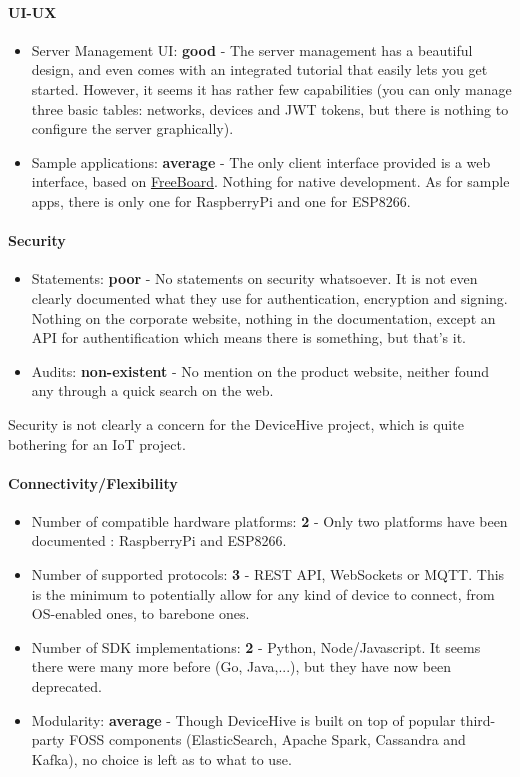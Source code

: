 \documentclass{article}
\begin{document}
\paragraph{UI-UX}

\begin{itemize}
\item Server Management UI: \textbf{good} - The server management has a beautiful design, and even comes with an integrated tutorial that easily lets you get started. However, it seems it has rather few capabilities (you can only manage three basic tables: networks, devices and JWT tokens, but there is nothing to configure the server graphically).
\item Sample applications: \textbf{average} - The only client interface provided is a web interface, based on \href{http://freeboard.io/}{FreeBoard}. Nothing for native development. As for sample apps, there is only one for RaspberryPi and one for ESP8266.
\end{itemize}

\paragraph{Security}

\begin{itemize}
\item Statements: \textbf{poor} - No statements on security whatsoever. It is not even clearly documented what they use for authentication, encryption and signing. Nothing on the corporate website, nothing in the documentation, except an API for authentification which means there is something, but that's it.
\item Audits: \textbf{non-existent} - No mention on the product website, neither found any through a quick search on the web.
\end{itemize}

Security is not clearly a concern for the DeviceHive project, which is quite bothering for an IoT project.

\paragraph{Connectivity/Flexibility}

\begin{itemize}
\item Number of compatible hardware platforms: \textbf{2} - Only two platforms have been documented : RaspberryPi and ESP8266.
\item Number of supported protocols: \textbf{3} - REST API, WebSockets or MQTT. This is the minimum to potentially allow for any kind of device to connect, from OS-enabled ones, to barebone ones.
\item Number of SDK implementations: \textbf{2} - Python, Node/Javascript. It seems there were many more before (Go, Java,...), but they have now been deprecated.
\item Modularity: \textbf{average} - Though DeviceHive is built on top of popular third-party FOSS components (ElasticSearch, Apache Spark, Cassandra and Kafka), no choice is left as to what to use.
\end{itemize}
\end{document}
